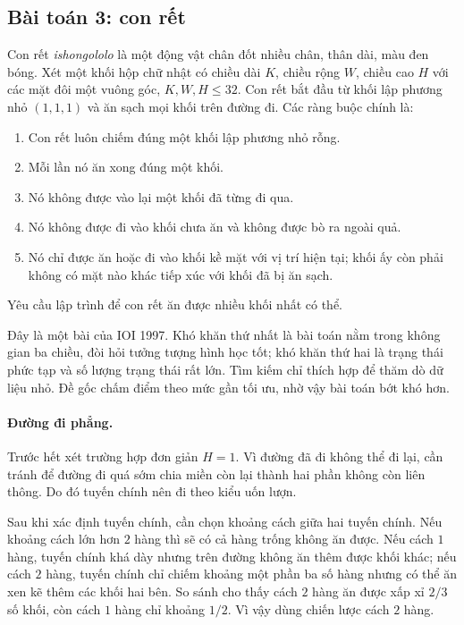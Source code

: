 \documentclass[11pt]{article}
\newcommand{\problem}[1]{\subsection*{#1}}
\begin{document}
\problem{Bài toán 3: con rết}

Con rết \emph{ishongololo} là một động vật chân đốt nhiều chân, thân dài,
màu đen bóng. Xét một khối hộp chữ nhật có chiều dài $K$, chiều rộng $W$,
chiều cao $H$ với các mặt đôi một vuông góc, $K,W,H\le 32$. Con rết bắt đầu
từ khối lập phương nhỏ $(1,1,1)$ và ăn sạch mọi khối trên đường đi. Các ràng
buộc chính là:

\begin{enumerate}
  \item Con rết luôn chiếm đúng một khối lập phương nhỏ rỗng.
  \item Mỗi lần nó ăn xong đúng một khối.
  \item Nó không được vào lại một khối đã từng đi qua.
  \item Nó không được đi vào khối chưa ăn và không được bò ra ngoài quả.
  \item Nó chỉ được ăn hoặc đi vào khối kề mặt với vị trí hiện tại; khối ấy
  còn phải không có mặt nào khác tiếp xúc với khối đã bị ăn sạch.
\end{enumerate}

Yêu cầu lập trình để con rết ăn được nhiều khối nhất có thể.

Đây là một bài của IOI 1997. Khó khăn thứ nhất là bài toán nằm trong không
gian ba chiều, đòi hỏi tưởng tượng hình học tốt; khó khăn thứ hai là trạng
thái phức tạp và số lượng trạng thái rất lớn. Tìm kiếm chỉ thích hợp để thăm
dò dữ liệu nhỏ. Đề gốc chấm điểm theo mức gần tối ưu, nhờ vậy bài toán bớt
khó hơn.

\paragraph{Đường đi phẳng.}
Trước hết xét trường hợp đơn giản $H=1$. Vì đường đã đi không thể đi lại,
cần tránh để đường đi quá sớm chia miền còn lại thành hai phần không còn liên
thông. Do đó tuyến chính nên đi theo kiểu uốn lượn.

Sau khi xác định tuyến chính, cần chọn khoảng cách giữa hai tuyến chính. Nếu
khoảng cách lớn hơn $2$ hàng thì sẽ có cả hàng trống không ăn được. Nếu cách
$1$ hàng, tuyến chính khá dày nhưng trên đường không ăn thêm được khối khác;
nếu cách $2$ hàng, tuyến chính chỉ chiếm khoảng một phần ba số hàng nhưng có
thể ăn xen kẽ thêm các khối hai bên. So sánh cho thấy cách $2$ hàng ăn được
xấp xỉ $2/3$ số khối, còn cách $1$ hàng chỉ khoảng $1/2$. Vì vậy dùng chiến
lược cách $2$ hàng.

\begin{center}
\end{center}
\end{document}
